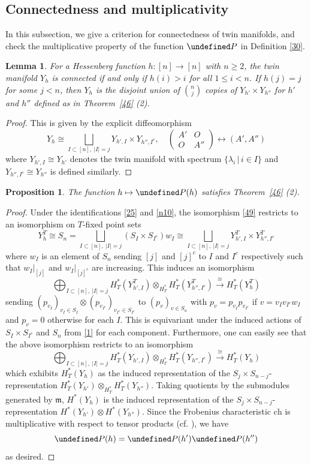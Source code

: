 \documentclass[11pt]{article}
\newtheorem{proposition}[theo]{Proposition}
\newtheorem{lemma}[theo]{Lemma}
\theoremstyle{definition}
\numberwithin{equation}{section}
\let\cal\undefined
\numberwithin{equation}{section}
\newcommand{\cal}{\mathcal}
\newcommand\cP{{\cal P}}
\newcommand\ch{\mathrm{ch} }
\newcommand\beq{\begin{equation}}
\newcommand\eeq{\end{equation}}
\begin{document}
\subsection{Connectedness and multiplicativity}\label{n18}
In this subsection, we give a criterion for connectedness of twin manifolds, and check the multiplicative property of the function $\cP$ in Definition \ref{30}. 
\begin{lemma}
	For a Hessenberg function $h:[n]\to [n]$ with $n\ge 2$, the twin manifold $Y_h$ is connected if and only if $h(i)>i$ for all $1\leq i<n$. If $h(j)=j$ for some $j<n$, then $Y_h$ is the disjoint union of $\binom{n}{j}$ copies of $Y_{h'}\times Y_{h''}$ for $h'$ and $h''$ defined as in Theorem~\ref{46} (2). 
\end{lemma} 
\begin{proof}
	This is given by the explicit diffeomorphism 
	\beq \label{49} Y_h\cong \bigsqcup_{I\subset[n], ~\lvert I\rvert=j} Y_{h',I}\times Y_{h'', I^c}, \quad \begin{pmatrix}
		A' &O\\ O&A''
	\end{pmatrix}\leftrightarrow (A',A'')\eeq
	where $Y_{h',I}\cong Y_{h'}$ denotes the twin manifold with spectrum $\{\lambda_i\,|\,i\in I\}$ and $Y_{h'',I^c}\cong Y_{h''}$ is defined similarly. 
\end{proof}
\begin{proposition}\label{58}
The function $h\mapsto \cP(h)$ satisfies Theorem~\ref{46} (2).
\end{proposition}
\begin{proof}
	Under the identifications \eqref{25} and \eqref{n10}, the isomorphism \eqref{49} restricts to an isomorphism on $T$-fixed point sets
	\[Y_h^T\cong S_n =\bigsqcup_{I\subset[n],~\lvert I\rvert =j}(S_I\times S_{I^c})w_I\cong \bigsqcup_{I\subset [n], ~\lvert I\rvert =j}Y_{h',I}^T\times Y_{h'',I^c}^T\]
	where $w_I$ is an element of $S_n$ sending $[j]$ and $[j]^c$ to $I$ and $I^c$ respectively such that $w_I|_{[j]}$ and $w_I|_{[j]^c}$ are increasing. 
	This induces an isomorphism 
	\[\bigoplus_{I\subset [n],~ \lvert I\rvert=j}H^*_T(Y_{h',I}^T)\otimes_{H^*_T}H^*_T(Y_{h'',{I^c}}^T)\xrightarrow{~\cong~}H^*_T(Y_{h}^T)\]
	sending $(p_{v_I})_{v_I\in S_I}\otimes (p_{v_{I^c}})_{v_{I^c}\in S_{I^c}}$ to $(p_v)_{v\in S_n}$ with $p_v=p_{v_I}p_{v_{I^c}}$ 
	if 
	$v=v_Iv_{I^c}w_I$
	and $p_v=0$ otherwise for each $I$. This is equivariant under the induced actions of $S_I\times S_{I^c}$ and $S_n$ from \eqref{1} 
	for each component.
	Furthermore, one can easily see that the above isomorphism restricts to an isomorphism
	\[\bigoplus_{I\subset [n],~ \lvert I\rvert=j}H^*_T(Y_{h',I})\otimes_{H^*_T}H^*_T(Y_{h'',{I^c}})\xrightarrow{~\cong~}H^*_T(Y_{h})\]
	which exhibits $H^*_T(Y_h)$ as the induced representation of the $S_j\times S_{n-j}$-representation $H^*_T(Y_{h'})\otimes_{H^*_T} H^*_T(Y_{h''})$. Taking quotients by the submodules generated by $\mathfrak{m}$, $H^*(Y_h)$ is the induced representation of the $S_j\times S_{n-j}$-representation $H^*(Y_{h'})\otimes H^*(Y_{h''})$. 
	Since the Frobenius characteristic $\ch$ is multiplicative with respect to 
	tensor products (cf. \cite[I,~(7.3)]{Mac}),
	we have $$\cP(h)=\cP(h')\cP(h'')$$ as desired. 
\end{proof}
\end{document}
